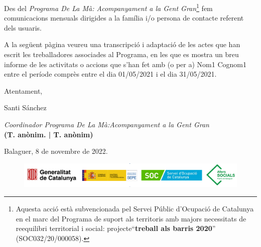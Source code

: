 \documentclass[a4paper,12pt]{elsarticle}  %
\begin{document}
Des del \textit{Programa De La Mà: Acompanyament a la Gent Gran}\footnote{Aquesta acció està subvencionada pel Servei Públic 
d'Ocupació de Catalunya en el marc del Programa de suport als territoris amb majors 
necessitats de reequilibri territorial i social: projecte``\textbf{treball als barris 2020}'' (SOC032/20/000058).} fem comunicacions mensuals
dirigides a la família i/o persona de contacte referent dels usuaris.


A la següent pàgina veureu una transcripció i adaptació de les actes que han escrit les treballadores associades
al Programa, en les que es mostra un breu informe de les activitats o accions que s'han fet amb (o per a) 
Nom1 Cognom1 entre el període comprès entre el dia 01/05/2021 i el dia 31/05/2021.

	\vspace{0.5cm}

\noindent Atentament,

\noindent Santi Sánchez

\noindent \textit{Coordinador Programa De La Mà:Acompanyament a la Gent Gran}\\
\textbf{(T. anònim. | T. anònim)}

	\vspace{0.5cm}

\noindent Balaguer, 8 de novembre de 2022.

	









\vfill

\FloatBarrier
\begin{figure}[h]
	\centering	
	\includegraphics[width=1\textwidth]{../IMATGES/logosGeneMinisterAferssocialsSoc.png}	
\end{figure}
\FloatBarrier	










\clearpage
\end{document}
